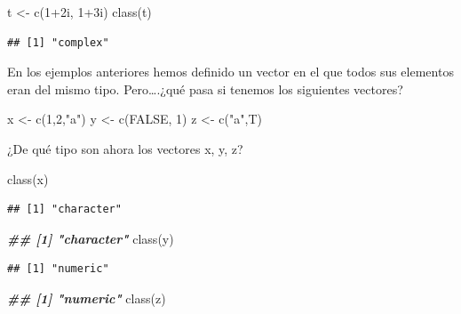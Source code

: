 \documentclass[
]{book}
\newenvironment{Shaded}{\begin{snugshade}}{\end{snugshade}}
\newcommand{\ConstantTok}[1]{\textcolor[rgb]{0.00,0.00,0.00}{#1}}
\newcommand{\DecValTok}[1]{\textcolor[rgb]{0.00,0.00,0.81}{#1}}
\newcommand{\DocumentationTok}[1]{\textcolor[rgb]{0.56,0.35,0.01}{\textbf{\textit{#1}}}}
\newcommand{\FunctionTok}[1]{\textcolor[rgb]{0.00,0.00,0.00}{#1}}
\newcommand{\NormalTok}[1]{#1}
\newcommand{\OtherTok}[1]{\textcolor[rgb]{0.56,0.35,0.01}{#1}}
\newcommand{\SpecialCharTok}[1]{\textcolor[rgb]{0.00,0.00,0.00}{#1}}
\newcommand{\StringTok}[1]{\textcolor[rgb]{0.31,0.60,0.02}{#1}}
\begin{document}
\begin{Shaded}
\begin{Highlighting}[]
\NormalTok{t }\OtherTok{\textless{}{-}} \FunctionTok{c}\NormalTok{(}\DecValTok{1}\SpecialCharTok{+}\NormalTok{2i, }\DecValTok{1}\SpecialCharTok{+}\NormalTok{3i)}
\FunctionTok{class}\NormalTok{(t)}
\end{Highlighting}
\end{Shaded}

\begin{verbatim}
## [1] "complex"
\end{verbatim}

En los ejemplos anteriores hemos definido un vector en el que todos sus elementos eran del mismo tipo. Pero\ldots.¿qué pasa si tenemos los siguientes vectores?

\begin{Shaded}
\begin{Highlighting}[]
\NormalTok{x }\OtherTok{\textless{}{-}} \FunctionTok{c}\NormalTok{(}\DecValTok{1}\NormalTok{,}\DecValTok{2}\NormalTok{,}\StringTok{"a"}\NormalTok{)}
\NormalTok{y }\OtherTok{\textless{}{-}} \FunctionTok{c}\NormalTok{(}\ConstantTok{FALSE}\NormalTok{, }\DecValTok{1}\NormalTok{)}
\NormalTok{z }\OtherTok{\textless{}{-}} \FunctionTok{c}\NormalTok{(}\StringTok{"a"}\NormalTok{,T)}
\end{Highlighting}
\end{Shaded}

¿De qué tipo son ahora los vectores x, y, z?

\begin{Shaded}
\begin{Highlighting}[]
\FunctionTok{class}\NormalTok{(x)}
\end{Highlighting}
\end{Shaded}

\begin{verbatim}
## [1] "character"
\end{verbatim}

\begin{Shaded}
\begin{Highlighting}[]
\DocumentationTok{\#\# [1] "character"}
\FunctionTok{class}\NormalTok{(y)}
\end{Highlighting}
\end{Shaded}

\begin{verbatim}
## [1] "numeric"
\end{verbatim}

\begin{Shaded}
\begin{Highlighting}[]
\DocumentationTok{\#\# [1] "numeric"}
\FunctionTok{class}\NormalTok{(z)}
\end{Highlighting}
\end{Shaded}
\end{document}
